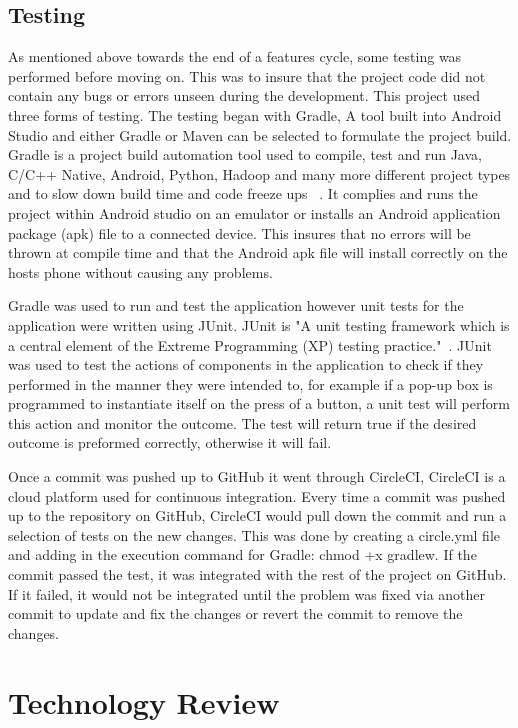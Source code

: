 \pagebreak
\section{Testing}
As mentioned above towards the end of a features cycle, some testing was performed before moving on. This was to insure that the project code did not contain any bugs or errors unseen during the development. This project used three forms of testing. The testing began with Gradle, A tool built into Android Studio and either Gradle or Maven can be selected to formulate the project build. Gradle is a project build automation tool used to compile, test and run Java, C/C++ Native, Android, Python, Hadoop and many more different project types and to slow down build time and code freeze ups ~\cite{gradle}. It complies and runs the project within Android studio on an emulator or installs an Android application package (apk) file to a connected device. This insures that no errors will be thrown at compile time and that the Android apk file will install correctly on the hosts phone without causing any problems. 

Gradle was used to run and test the application however unit tests for the application were written using JUnit. JUnit is "A unit testing framework which is a central element of the Extreme Programming (XP) testing practice."~\cite{junit}. JUnit was used to test the actions of components in the application to check if they performed in the manner they were intended to, for example if a pop-up box is programmed to instantiate itself on the press of a button, a unit test will perform this action and monitor the outcome. The test will return true if the desired outcome is preformed correctly, otherwise it will fail.

Once a commit was pushed up to GitHub it went through CircleCI, CircleCI is a cloud platform used for continuous integration. Every time a commit was pushed up to the repository on GitHub, CircleCI would pull down the commit and run a selection of tests on the new changes. This was done by creating a circle.yml file and adding in the execution command for Gradle: chmod +x gradlew. If the commit passed the test, it was integrated with the rest of the project on GitHub. If it failed, it would not be integrated until the problem was fixed via another commit to update and fix the changes or revert the commit to remove the changes.

\chapter{Technology Review}

